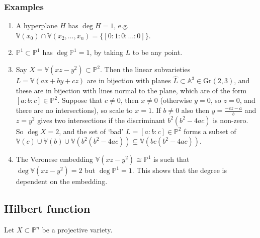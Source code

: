 \documentclass[10pt]{article}
\newcommand{\van}{\mathbb{V}}
\newcommand{\aff}{\mathbb{A}}
\newcommand{\pee}{\mathbb{P}}
\begin{document}
            \subsubsection{Examples}

                \begin{enumerate}
                    \item A hyperplane $H$ has $\deg H=1$, e.g. $\van(x_0)\cap\van(x_2,\ldots,x_n)=\{[0:1:0:\ldots:0]\}$.
                    \item $\pee^1\subset\pee^1$ has $\deg\pee^1=1$, by taking $L$ to be any point.
                    \item Say $X=\van(xz-y^2)\subset\pee^2$.
                        Then the linear subvarieties $L=\van(ax+by+cz)$ are in bijection with planes $\widehat{L}\subset\aff^3\in\mathrm{Gr}(2,3)$, and these are in bijection with lines normal to the plane, which are of the form $[a:b:c]\in\pee^2$.
                        Suppose that $c\neq0$, then $x\neq0$ (otherwise $y=0$, so $z=0$, and there are no intersections), so scale to $x=1$.
                        If $b\neq0$ also then $y=\frac{-cz-a}{b}$ and $z=y^2$ gives two intersections if the discriminant $b^2(b^2-4ac)$ is non-zero.
                        So $\deg X=2$, and the set of `bad' $L=[a:b:c]\in\pee^2$ forms a subset of $\van(c)\cup\van(b)\cup\van(b^2(b^2-4ac))\subsetneq\van(bc(b^2-4ac))$.
                    \item The Veronese embedding $\van(xz-y^2)\cong\pee^1$ is such that $\deg\van(xz-y^2)=2$ but \mbox{$\deg\pee^1=1$}.
                        This shows that the degree is dependent on the embedding.
                \end{enumerate}

        \subsection{Hilbert function}

            Let $X\subset\pee^n$ be a projective variety.
\end{document}
